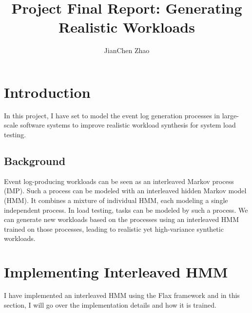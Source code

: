 

\title{Project Final Report: Generating Realistic Workloads}
\author{JianChen Zhao}





\maketitle

\section{Introduction}

In this project, I have set to model the event log generation processes in
large-scale software systems to improve realistic workload synthesis for system
load testing.

\subsection{Background}

Event log-producing workloads can be seen as an interleaved Markov process
(IMP). Such a process can be modeled with an interleaved hidden Markov model
(HMM). It combines a mixture of individual HMM, each modeling a single
independent process. In load testing, tasks can be modeled by such a process. We
can generate new workloads based on the processes using an interleaved HMM
trained on those processes, leading to realistic yet high-variance synthetic
workloads.

\section{Implementing Interleaved HMM}

I have implemented an interleaved HMM using the Flax\cite{Heek2023-nl} framework
and in this section, I will go over the implementation details and how it is
trained.

